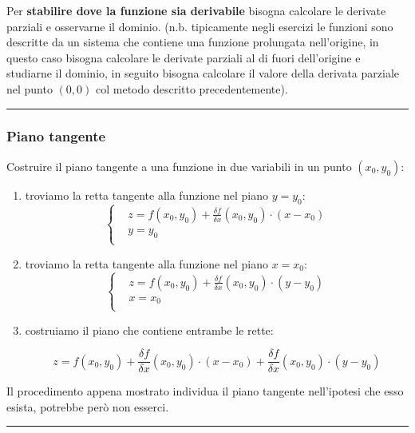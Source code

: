 \begin{tcolorbox}
Per \textbf{stabilire dove la funzione sia derivabile} bisogna calcolare le derivate parziali e osservarne il dominio.\newline
(n.b. tipicamente negli esercizi le funzioni sono descritte da un sistema che contiene una funzione prolungata nell'origine, in questo caso bisogna calcolare le derivate parziali al di fuori dell'origine e studiarne il dominio, in seguito bisogna calcolare il valore della derivata parziale nel punto $(0,0)$ col metodo descritto precedentemente).
\end{tcolorbox}
\rule{\textwidth}{0.4pt}
\subsubsection*{Piano tangente}
Costruire il piano tangente a una funzione in due variabili in un punto $(x_0, y_0)$:
\begin{enumerate}
    \item troviamo la retta tangente alla funzione nel piano $y=y_0$:
    \[
        \begin{cases}
            &z = f(x_0, y_0) + \frac{\delta f}{\delta x}(x_0, y_0) \cdot (x-x_0)\\
            &y=y_0 \\
        \end{cases}
    \]
    \item troviamo la retta tangente alla funzione nel piano $x=x_0$:
    \[
        \begin{cases}
            &z = f(x_0, y_0) + \frac{\delta f}{\delta x}(x_0, y_0) \cdot (y-y_0)\\
            &x=x_0 \\
        \end{cases}
    \]
    \item costruiamo il piano che contiene entrambe le rette:
    \begin{tcolorbox}
    \[
        z = f(x_0, y_0) + \frac{\delta f}{\delta x}(x_0, y_0) \cdot (x-x_0) + \frac{\delta f}{\delta x}(x_0, y_0) \cdot (y-y_0)
    \]
    \end{tcolorbox}
\end{enumerate}
Il procedimento appena mostrato individua il piano tangente nell'ipotesi che esso esista, potrebbe però non esserci.\newline
\rule{\textwidth}{0.4pt}
